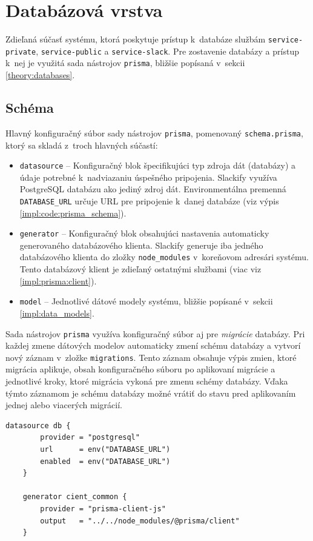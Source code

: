 \section{Databázová vrstva}
\label{impl:database}
Zdieľaná súčasť systému, ktorá poskytuje prístup k~databáze službám \texttt{service-private}, \texttt{service-public} a \texttt{service-slack}. Pre zostavenie databázy a prístup k~nej je využitá sada nástrojov \texttt{prisma}, bližšie popísaná v~sekcii \ref{theory:databases}.

\subsection{Schéma}
Hlavný konfiguračný súbor sady nástrojov \texttt{prisma}, pomenovaný \texttt{schema.prisma}, ktorý sa skladá z~troch hlavných súčastí:

\begin{itemize}
	\item \texttt{datasource} -- Konfiguračný blok špecifikujúci typ zdroja dát (databázy) a údaje potrebné k~nadviazaniu úspešného pripojenia. Slackify využíva PostgreSQL databázu ako jediný zdroj dát. Environmentálna premenná \texttt{DATABASE\_URL} určuje URL pre pripojenie k~danej databáze (viz výpis \ref{impl:code:prisma_schema}).
	\item \texttt{generator} -- Konfiguračný blok obsahujúci nastavenia automaticky generovaného databázového klienta. Slackify generuje iba jedného databázového klienta do zložky \texttt{node\_modules} v~koreňovom adresári systému. Tento databázový klient je zdieľaný ostatnými službami (viac viz \ref{impl:prisma:client}).
	\item \texttt{model} -- Jednotlivé dátové modely systému, bližšie popísané v~sekcii \ref{impl:data_models}.
\end{itemize}

\noindent Sada nástrojov \texttt{prisma} využíva konfiguračný súbor aj pre \emph{migrácie} databázy. Pri každej zmene dátových modelov automaticky zmení schému databázy a vytvorí nový záznam v~zložke \texttt{migrations}. Tento záznam obsahuje výpis zmien, ktoré migrácia aplikuje, obsah konfiguračného súboru po aplikovaní migrácie a jednotlivé kroky, ktoré migrácia vykoná pre zmenu schémy databázy. Vďaka týmto záznamom je schému databázy možné vrátiť do stavu pred aplikovaním jednej alebo viacerých migrácií.

\begin{lstlisting}[language={Prisma}, label={impl:code:prisma_schema}, caption=Špecifikácia \texttt{datasource} a \texttt{generator} v~konfiguračnom súbore \texttt{prisma}.]
	datasource db {
		provider = "postgresql"
		url      = env("DATABASE_URL")
		enabled  = env("DATABASE_URL")
	}

	generator cient_common {
		provider = "prisma-client-js"
		output   = "../../node_modules/@prisma/client"
	}
\end{lstlisting}

